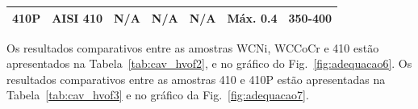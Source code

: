 \begin{table}[]
\begin{tabular}{lllllll}
\multicolumn{1}{|l|}{410P}   & \multicolumn{1}{l|}{AISI 410} & \multicolumn{1}{l|}{N/A}                                                                & \multicolumn{1}{l|}{N/A}                                       & \multicolumn{1}{l|}{N/A}                                            & \multicolumn{1}{l|}{Máx. 0.4}                                      & \multicolumn{1}{l|}{350-400}                                      \\ \hline
\end{tabular}
\end{table}

Os resultados comparativos entre as amostras WCNi, WCCoCr e 410 estão
apresentados na Tabela~\ref{tab:cav_hvof2}, e no gráfico do
Fig.~\ref{fig:adequacao6}. Os resultados comparativos entre as amostras 410 e
410P estão apresentadas na Tabela~\ref{tab:cav_hvof3} e no gráfico da
Fig.~\ref{fig:adequacao7}.

